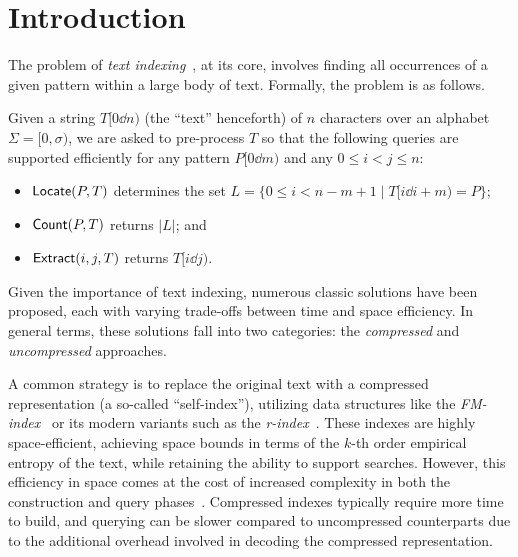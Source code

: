 \section{Introduction}\label{sec:introduction}


The problem of \textit{text indexing}~\cite{navarro2007compressed}, at its core, involves finding all occurrences of a given pattern within a large body of text. Formally, the problem is as follows.

\begin{problem}
Given a string $T[0\dd n)$ (the ``text'' henceforth) of $n$ characters over an alphabet $\Sigma = [0 , \sigma)$, we are asked to pre-process $T$ so that the following queries are supported efficiently for any pattern $P[0 \dd m)$ and any $0 \leq i < j \leq n$:
\begin{itemize}
    \item $\textup{\textsf{Locate}}(P,T)$ determines the set $L = \{0 \leq i < n-m+1 \mid T[i \dd i+m) = P \}$;
    \item $\textup{\textsf{Count}}(P,T)$ returns $|L|$; and
    \item $\textup{\textsf{Extract}}(i,j,T)$ returns $T[i \dd j)$.
\end{itemize}
\end{problem}

Given the importance of text indexing, numerous classic solutions have been proposed, each with varying trade-offs between time and space efficiency. In general terms, these solutions fall into two categories: the \emph{compressed} and \emph{uncompressed} approaches.

A common strategy is to replace the original text with a compressed representation (a so-called ``self-index''), utilizing data structures like the \textit{FM-index}~\cite{10.1145/1082036.1082039} or its modern variants such as the \textit{r-index}~\cite{10.1145/3375890}. These indexes are highly space-efficient,  achieving space bounds in terms of the $k$-th order empirical entropy of the text, while retaining the ability to support searches. However, this efficiency in space comes at the cost of increased complexity in both the construction and query phases~\cite{navarro2007compressed}. Compressed indexes typically require more time to build, and querying can be slower compared to uncompressed counterparts due to the additional overhead involved in decoding the compressed representation.

